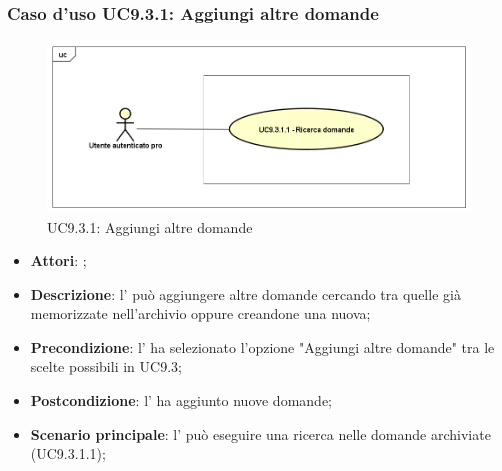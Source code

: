 		 \subsubsection{Caso d'uso UC9.3.1: Aggiungi altre domande}
		 \label{UC9.3.1}
		 \begin{figure}[h]
		 	\centering
		 	\includegraphics[scale=0.5,keepaspectratio]{UML/UC9_3_1.png}
		 	\caption{UC9.3.1: Aggiungi altre domande}
		 \end{figure}
		 \FloatBarrier
		 \begin{itemize}
		 	\item \textbf{Attori}: \uaupro{};
		 	\item \textbf{Descrizione}: l'\uaupro{} può aggiungere altre domande cercando tra quelle già memorizzate nell'archivio oppure creandone una nuova; 
		 	\item \textbf{Precondizione}: l'\uaupro{} ha selezionato l'opzione "Aggiungi altre domande" tra le scelte possibili in UC9.3;
		 	\item \textbf{Postcondizione}: l'\uaupro{} ha aggiunto nuove domande;
		 	\item \textbf{Scenario principale}: l'\uaupro{} può eseguire una ricerca nelle domande archiviate (UC9.3.1.1);
		 \end{itemize}
		 

